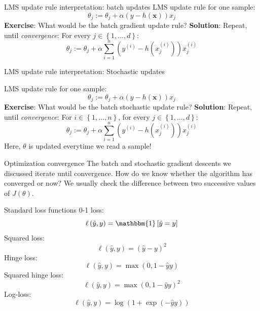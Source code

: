 \documentclass{beamer}
\newcommand{\bx}{\bm{x}}
\newcommand{\yi}{y^{(i)}}
\newcommand{\1}[1]{\mathbbm{1}\left[#1\right]}
\begin{document}
\begin{frame}{LMS update rule interpretation: batch updates}
LMS update rule for one sample:
\begin{equation*}
 \theta_j := \theta_j + \alpha \left( y - h\left(\bx\right)\right) x_j
\end{equation*}
\pause
\vfill
\textbf{Exercise}: What would be the batch gradient update rule?
\pause
\vfill
\textbf{Solution}: Repeat, until \textit{convergence}: For every $j \in \left\{ 1, \dots, d\right\}$:
\begin{equation*}
\theta_j := \theta_j + \alpha \sum_{i = 1}^n \left(\yi - h\left(x^{(i)}_j\right)\right) x^{(i)}_j
\end{equation*}

\end{frame}

\begin{frame}{LMS update rule interpretation: Stochastic updates}

LMS update rule for one sample:
\begin{equation*}
 \theta_j := \theta_j + \alpha \left( y - h\left(\bx\right)\right) x_j
\end{equation*}
\pause
\vfill
\textbf{Exercise}: What would be the batch stochastic update rule?
\pause
\vfill
\textbf{Solution}: Repeat, until \textit{convergence}: For $i \in \left\{1, \dots, n \right\}$, for every $j \in \left\{ 1, \dots, d\right\}$:
\begin{equation*}
\theta_j := \theta_j + \alpha \sum_{i = 1}^n \left(\yi - h\left(x^{(i)}_j\right)\right) x^{(i)}_j
\end{equation*}
Here, $\theta$ is updated everytime we read a sample!
\end{frame}

\begin{frame}{Optimization convergence}
The batch and stochastic gradient descents we discussed iterate until convergence. How do we know whether the algorithm has converged or now?
\vfill
\pause
We usually check the difference between two successive values of $J(\theta)$.
\end{frame}

\begin{frame}{Standard loss functions}
0-1 loss:
$$ \ell \left( \hat{y}, y \right) = \1{\hat{y} = y}$$
\vfill
\pause
Squared loss:
$$ \ell \left( \hat{y}, y \right) = \left( \hat{y} - y\right)^2$$
\vfill
\pause
Hinge loss:
$$ \ell \left( \hat{y}, y \right) = \max\left(0, 1 - \hat{y} y\right)$$
\vfill
\pause
Squared hinge loss:
$$ \ell \left( \hat{y}, y \right) = \max\left(0, 1 - \hat{y} y\right)^2 $$
\vfill
\pause
Log-loss:
$$ \ell \left( \hat{y}, y \right) = \log \left( 1 + \exp ( - \hat{y}y )\right) $$
\end{frame}
\end{document}
